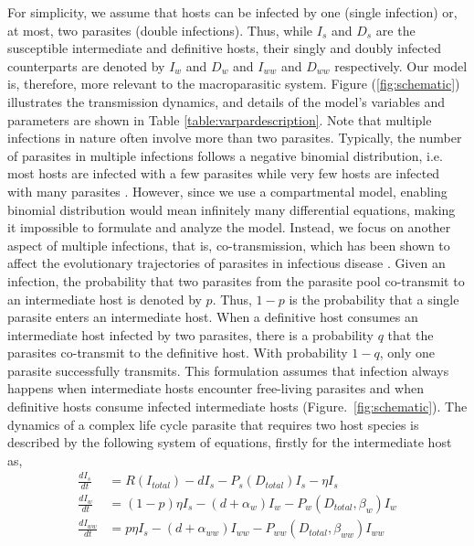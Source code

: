 \documentclass[a4paper]{scrartcl}
\begin{document}
For simplicity, we assume that hosts can be infected by one (single infection) or, at most, two parasites (double infections).
Thus, while $I_s$ and $D_s$ are the susceptible intermediate and definitive hosts, their singly and doubly infected counterparts are denoted by $I_w$ and $D_w$ and $I_{ww}$ and $D_{ww}$ respectively.
Our model is, therefore, more relevant to the macroparasitic system.
Figure (\ref{fig:schematic}) illustrates the transmission dynamics, and details of the model's variables and parameters are shown in Table \ref{table:varpardescription}.
Note that multiple infections in nature often involve more than two parasites.
Typically, the number of parasites in multiple infections follows a negative binomial distribution, i.e. most hosts are infected with a few parasites while very few hosts are infected with many parasites \citep{wilson:FE:1996}.
However, since we use a compartmental model, enabling binomial distribution would mean infinitely many differential equations, making it impossible to formulate and analyze the model.
Instead, we focus on another aspect of multiple infections, that is, co-transmission, which has been shown to affect the evolutionary trajectories of parasites in infectious disease \citep{Alizon2012}.
Given an infection, the probability that two parasites from the parasite pool co-transmit to an intermediate host is denoted by $p$. 
Thus, $1-p$ is the probability that a single parasite enters an intermediate host. 
When a definitive host consumes an intermediate host infected by two parasites, there is a probability $q$ that the parasites co-transmit to the definitive host.
With probability $1-q$, only one parasite successfully transmits. 
This formulation assumes that infection always happens when intermediate hosts encounter free-living parasites and when definitive hosts consume infected intermediate hosts (Figure.~\ref{fig:schematic}).
The dynamics of a complex life cycle parasite that requires two host species is described by the following system of equations, firstly for the intermediate host as,
%
\begin{align}
\frac{dI_s}{dt} &= R(I_{total}) - d I_s - P_s(D_{total}) I_s  - \eta  I_s \nonumber \\ 
\frac{dI_w}{dt} &=  (1 - p) \eta I_s  - (d + \alpha_w) I_w - P_w(D_{total}, \beta_w) I_w \label{odes:ihosts} \\
\frac{dI_{ww}}{dt} &= p \eta I_s  - (d + \alpha_{ww}) I_{ww} - P_{ww}(D_{total}, \beta_{ww}) I_{ww} \nonumber
\end{align}
\end{document}
